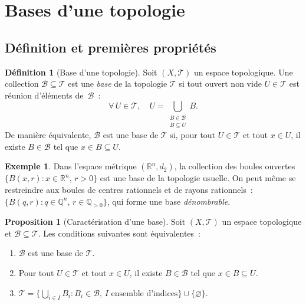 \documentclass[12pt,a4paper,openany]{book}
\theoremstyle{definition}
\newtheorem{definition}{Définition}[chapter]
\theoremstyle{cours}
\newtheorem{proposition}[theoreme]{Proposition}
\theoremstyle{coursnormal}
\newtheorem{exemple}[theoreme]{Exemple}
\newcommand{\Q}{\mathbb{Q}}
\newcommand{\R}{\mathbb{R}}
\newcommand{\T}{\mathcal{T}}
\newcommand{\B}{\mathcal{B}}
\begin{document}
\section{Bases d'une topologie}\label{sec:bases}

\subsection{Définition et premières propriétés}\label{subsec:base-def}

\begin{definition}[Base d'une topologie]\label{def:base}
  Soit $(X,\T)$ un espace topologique. Une collection
  $\B\subseteq\T$ est une \emph{base} de la
  topologie $\T$ si tout ouvert non vide $U\in\T$ est réunion d'éléments
  de~$\B$~:
  \[
    \forall\, U\in\T,\quad
    U = \bigcup_{\substack{B\in\B \\ B\subseteq U}} B.
  \]
  De manière équivalente, $\B$ est une base de $\T$ si, pour tout $U\in\T$ et
  tout $x\in U$, il existe $B\in\B$ tel que $x\in B\subseteq U$.
\end{definition}

\begin{exemple}
  Dans l'espace métrique $(\R^n,d_2)$, la collection des boules ouvertes
  $\{B(x,r) : x\in\R^n,\, r>0\}$ est une base de la topologie usuelle. On
  peut même se restreindre aux boules de centres rationnels et de rayons
  rationnels~: $\{B(q,r) : q\in\Q^n,\, r\in\Q_{>0}\}$, qui forme une base
  \emph{dénombrable}.
\end{exemple}

\begin{proposition}[Caractérisation d'une base]\label{prop:carac-base}
  Soit $(X,\T)$ un espace topologique et $\B\subseteq\T$. Les conditions
  suivantes sont équivalentes~:
  \begin{enumerate}[label=\textup{(\roman*)}]
    \item $\B$ est une base de $\T$.
    \item Pour tout $U\in\T$ et tout $x\in U$, il existe $B\in\B$ tel que
      $x\in B\subseteq U$.
    \item $\T = \bigl\{\bigcup_{i\in I} B_i : B_i\in\B,\, I \text{ ensemble
      d'indices}\bigr\} \cup \{\varnothing\}$.
  \end{enumerate}
\end{proposition}
\end{document}
